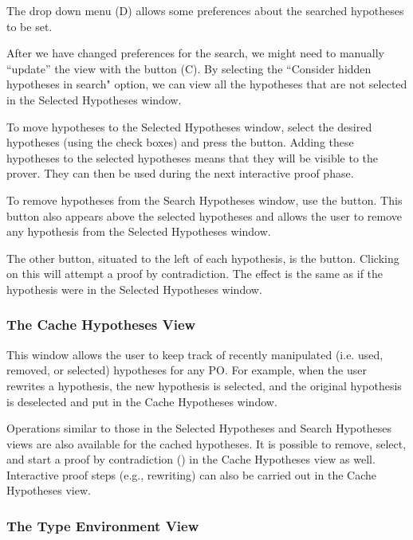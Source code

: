 The drop down menu (D) allows some preferences about the searched hypotheses to be set.

After we have changed preferences for the search, we might need to manually ``update'' the view with the button (C). By selecting the ``Consider hidden hypotheses in search" option, we can view all the hypotheses that are not selected in the \textsf{Selected Hypotheses} window.

To move hypotheses to the \textsf{Selected Hypotheses} window, select the desired hypotheses (using the check boxes) and press the  button. Adding these hypotheses to the selected hypotheses means that they will be visible to the prover. They can then be used during the next interactive proof phase.

To remove hypotheses from the \textsf{Search Hypotheses} window, use the  button. This button also appears above the selected hypotheses and allows the user to remove any hypothesis from the \textsf{Selected Hypotheses} window.

The other button, situated to the left of each hypothesis, is the  button. Clicking on this will attempt a proof by contradiction. The effect is the same as if the hypothesis were in the \textsf{Selected Hypotheses} window. 

\subsubsection{The Cache Hypotheses View}

This window allows the user to keep track of recently manipulated (i.e. used, removed, or selected) hypotheses for any PO. For example, when the user rewrites a hypothesis, the new hypothesis is selected, and the original hypothesis is deselected and put in the \textsf{Cache Hypotheses} window.

Operations similar to those in the \textsf{Selected Hypotheses} and \textsf{Search Hypotheses} views are also available for the cached hypotheses. It is possible to remove, select, and start a proof by contradiction () in the \textsf{Cache Hypotheses} view as well. Interactive proof steps (e.g., rewriting) can also be carried out in the \textsf{Cache Hypotheses} view.

\subsubsection{The Type Environment View}

